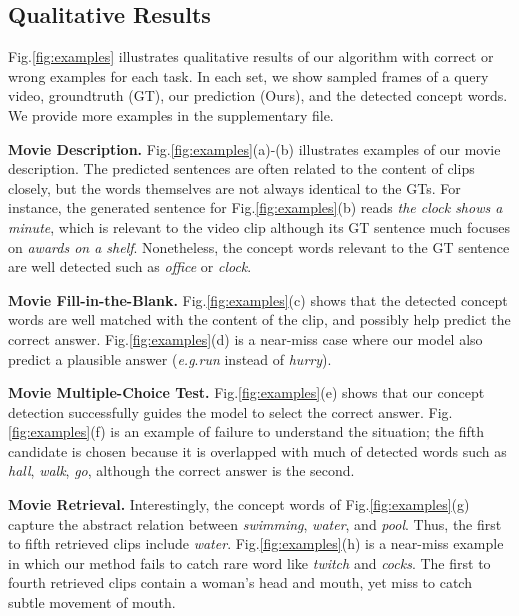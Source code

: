 \documentclass[10pt,twocolumn,letterpaper]{article}
\makeatletter
\theoremstyle{nonumberplain}
\DeclareRobustCommand\onedot{\futurelet\@let@token\@onedot}
\def\onedot{.\@\xspace}
\def\eg{\emph{e.g}\onedot} \def\Eg{\emph{E.g}\onedot}
\makeatother
\begin{document}
\smallskip
\subsection{Qualitative Results}
\label{sec:qual_results}

Fig.\ref{fig:examples} illustrates qualitative results of our algorithm with correct or wrong examples for each task.
In each set, we show sampled frames of a query video, groundtruth (GT), our prediction (Ours), and the detected concept words.
We provide more examples in the supplementary file.

\textbf{Movie Description.}
Fig.\ref{fig:examples}(a)-(b) illustrates examples of our movie description.
The predicted sentences are often related to the content of clips closely,
but the words themselves are not always identical to the GTs.
For instance, the generated sentence for Fig.\ref{fig:examples}(b) reads \textit{the clock shows a minute},
which is relevant to the video clip although its GT sentence much focuses on \textit{awards on a shelf}.
Nonetheless, the concept words relevant to the GT sentence are well detected such as \textit{office} or \textit{clock}.

\textbf{Movie Fill-in-the-Blank.}
Fig.\ref{fig:examples}(c) shows that the detected concept words are well matched with the content of the clip, and possibly help predict  the correct answer.
Fig.\ref{fig:examples}(d) is a near-miss case where our model also predict a plausible answer (\eg \textit{run} instead of \textit{hurry}).

\textbf{Movie Multiple-Choice Test.}
Fig.\ref{fig:examples}(e) shows that our concept detection successfully guides the model to select the correct answer.
Fig.\ref{fig:examples}(f) is an example of failure to understand the situation;
the fifth candidate is chosen because it is overlapped with much of detected words such as \textit{hall}, \textit{walk}, \textit{go}, although the correct answer is the second.

\textbf{Movie Retrieval.}
Interestingly, the concept words of Fig.\ref{fig:examples}(g) capture the abstract relation between \textit{swimming}, \textit{water}, and \textit{pool}.
Thus, the first to fifth retrieved clips include \textit{water}.
Fig.\ref{fig:examples}(h) is a near-miss example in which our method fails to catch rare word like \textit{twitch} and \textit{cocks}.
The first to fourth retrieved clips contain a woman's head and mouth, yet miss to catch subtle movement of mouth.
\end{document}
